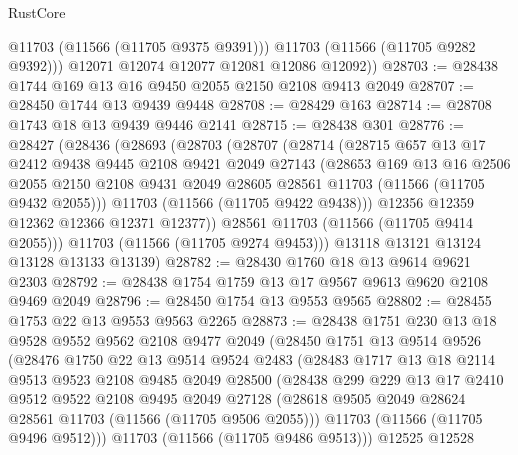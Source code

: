 \begin{lexlean}{RustCore}
\begin{coremodule}
            @11703
            (@11566 (@11705 @9375 @9391)))
          @11703
          (@11566 (@11705 @9282 @9392)))
        @12071
        @12074
        @12077
        @12081
        @12086
        @12092))
@28703 := @28438 @1744 @169 @13 @16 @9450 @2055 @2150 @2108 @9413 @2049
@28707 := @28450 @1744 @13 @9439 @9448
@28708 := @28429 @163
@28714 := @28708 @1743 @18 @13 @9439 @9446 @2141
@28715 := @28438 @301
@28776 := @28427
    (@28436
      (@28693
        (@28703
          (@28707
            (@28714
              (@28715
                @657
                @13
                @17
                @2412
                @9438
                @9445
                @2108
                @9421
                @2049
                @27143
                (@28653
                  @169
                  @13
                  @16
                  @2506
                  @2055
                  @2150
                  @2108
                  @9431
                  @2049
                  @28605
                  @28561
                  @11703
                  (@11566 (@11705 @9432 @2055)))
                @11703
                (@11566 (@11705 @9422 @9438)))
              @12356
              @12359
              @12362
              @12366
              @12371
              @12377))
          @28561
          @11703
          (@11566 (@11705 @9414 @2055)))
        @11703
        (@11566 (@11705 @9274 @9453)))
      @13118
      @13121
      @13124
      @13128
      @13133
      @13139)
@28782 := @28430 @1760 @18 @13 @9614 @9621 @2303
@28792 := @28438 @1754 @1759 @13 @17 @9567 @9613 @9620 @2108 @9469 @2049
@28796 := @28450 @1754 @13 @9553 @9565
@28802 := @28455 @1753 @22 @13 @9553 @9563 @2265
@28873 := @28438
    @1751
    @230
    @13
    @18
    @9528
    @9552
    @9562
    @2108
    @9477
    @2049
    (@28450
      @1751
      @13
      @9514
      @9526
      (@28476
        @1750
        @22
        @13
        @9514
        @9524
        @2483
        (@28483
          @1717
          @13
          @18
          @2114
          @9513
          @9523
          @2108
          @9485
          @2049
          @28500
          (@28438
            @299
            @229
            @13
            @17
            @2410
            @9512
            @9522
            @2108
            @9495
            @2049
            @27128
            (@28618 @9505 @2049 @28624 @28561 @11703 (@11566 (@11705 @9506 @2055)))
            @11703
            (@11566 (@11705 @9496 @9512)))
          @11703
          (@11566 (@11705 @9486 @9513)))
        @12525
        @12528

\end{coremodule}
\end{lexlean}
